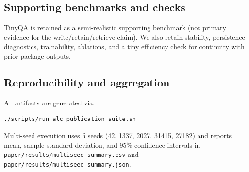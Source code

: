 \subsection{Supporting benchmarks and checks}
TinyQA is retained as a semi-realistic supporting benchmark (not primary evidence for the write/retain/retrieve claim). We also retain stability, persistence diagnostics, trainability, ablations, and a tiny efficiency check for continuity with prior package outputs.

\subsection{Reproducibility and aggregation}
All artifacts are generated via:
\begin{verbatim}
./scripts/run_alc_publication_suite.sh
\end{verbatim}
Multi-seed execution uses 5 seeds (42, 1337, 2027, 31415, 27182) and reports mean, sample standard deviation, and 95\% confidence intervals in \texttt{paper/results/multiseed\_summary.csv} and \texttt{paper/results/multiseed\_summary.json}.
